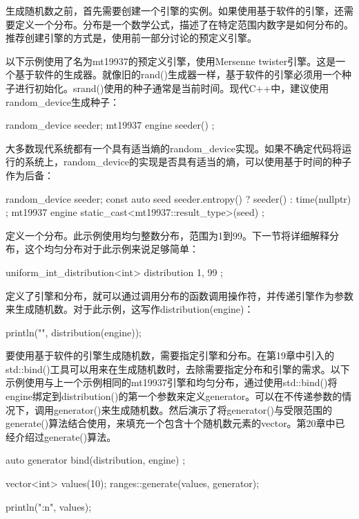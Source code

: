 生成随机数之前，首先需要创建一个引擎的实例。如果使用基于软件的引擎，还需要定义一个分布。分布是一个数学公式，描述了在特定范围内数字是如何分布的。推荐创建引擎的方式是，使用前一部分讨论的预定义引擎。

以下示例使用了名为mt19937的预定义引擎，使用Mersenne twister引擎。这是一个基于软件的生成器。就像旧的rand()生成器一样，基于软件的引擎必须用一个种子进行初始化。srand()使用的种子通常是当前时间。现代C++中，建议使用random\_device生成种子：

\begin{cpp}
random_device seeder;
mt19937 engine { seeder() };
\end{cpp}

大多数现代系统都有一个具有适当熵的random\_device实现。如果不确定代码将运行的系统上，random\_device的实现是否具有适当的熵，可以使用基于时间的种子作为后备：

\begin{cpp}
random_device seeder;
const auto seed { seeder.entropy() ? seeder() : time(nullptr) };
mt19937 engine { static_cast<mt19937::result_type>(seed) };
\end{cpp}

定义一个分布。此示例使用均匀整数分布，范围为1到99。下一节将详细解释分布，这个均匀分布对于此示例来说足够简单：

\begin{cpp}
uniform_int_distribution<int> distribution { 1, 99 };
\end{cpp}

定义了引擎和分布，就可以通过调用分布的函数调用操作符，并传递引擎作为参数来生成随机数。对于此示例，这写作distribution(engine)：

\begin{cpp}
println("{}", distribution(engine));
\end{cpp}

要使用基于软件的引擎生成随机数，需要指定引擎和分布。在第19章中引入的std::bind()工具可以用来在生成随机数时，去除需要指定分布和引擎的需求。以下示例使用与上一个示例相同的mt19937引擎和均匀分布，通过使用std::bind()将engine绑定到distribution()的第一个参数来定义generator。可以在不传递参数的情况下，调用generator()来生成随机数。然后演示了将generator()与受限范围的generate()算法结合使用，来填充一个包含十个随机数元素的vector。第20章中已经介绍过generate()算法。

\begin{cpp}
auto generator { bind(distribution, engine) };

vector<int> values(10);
ranges::generate(values, generator);

println("{:n}", values);
\end{cpp}

